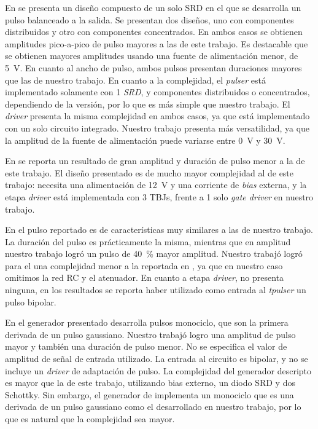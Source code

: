 En \cite{rulikowski2004} se presenta un diseño compuesto de un solo SRD en el que se desarrolla un
pulso balanceado a la salida. Se presentan dos diseños, uno con componentes distribuidos y otro con
componentes concentrados. En ambos casos se obtienen amplitudes pico-a-pico de pulso mayores a las
de este trabajo. Es destacable que se obtienen mayores amplitudes usando una fuente de alimentación
menor, de \qty{5}{\volt}. En cuanto al ancho de pulso, ambos pulsos presentan duraciones mayores que
las de nuestro trabajo. En cuanto a la complejidad, el \textit{pulser} está implementado solamente
con 1 \textit{SRD}, y componentes distribuidos o concentrados, dependiendo de la versión, por lo que
es más simple que nuestro trabajo. El \textit{driver} presenta la misma complejidad en ambos casos,
ya que está implementado con un solo circuito integrado. Nuestro trabajo presenta más versatilidad,
ya que la amplitud de la fuente de alimentación puede variarse entre \qty{0}{\volt} y
\qty{30}{\volt}.

En \cite{protiva2009} se reporta un resultado de gran amplitud y duración de pulso menor a la de
este trabajo. El diseño presentado es de mucho mayor complejidad al de este trabajo: necesita una
alimentación de \qty{12}{\volt} y una corriente de \textit{bias} externa, y la etapa \textit{driver}
está implementada con 3 TBJs, frente a 1 solo \textit{gate driver} en nuestro trabajo.

En \cite{kamal2014} el pulso reportado es de características muy similares a las de nuestro trabajo.
La duración del pulso es prácticamente la misma, mientras que en amplitud nuestro trabajo logró un
pulso de \qty{40}{\percent} mayor amplitud. Nuestro trabajó logró para el  una
complejidad menor a la reportada en \cite{kamal2014}, ya que en nuestro caso omitimos la red RC y el
atenuador. En cuanto a etapa \textit{driver}, \cite{kamal2014} no presenta ninguna, en los
resultados se reporta haber utilizado como entrada al \textit{tpulser} un pulso bipolar.

En \cite{han2002} el generador presentado desarrolla pulsos monociclo, que son la primera derivada
de un pulso gaussiano. Nuestro trabajó logro una amplitud de pulso mayor y también una duración de
pulso menor. No se especifica el valor de amplitud de señal de entrada utilizado. La entrada al
circuito es bipolar, y no se incluye un \textit{driver} de adaptación de pulso. La complejidad del
generador descripto es mayor que la de este trabajo, utilizando bias externo, un diodo SRD y dos
Schottky. Sin embargo, el generador de \cite{han2002} implementa un monociclo que es una derivada de
un pulso gaussiano como el desarrollado en nuestro trabajo, por lo que es natural que la complejidad
sea mayor.

